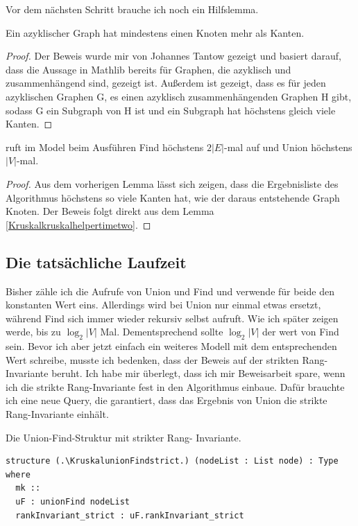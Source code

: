 Vor dem nächsten Schritt brauche ich noch ein Hilfslemma.

\begin{lemma}[\SimpleGraphIsAcycliccardedgeFinsetle]
  Ein azyklischer Graph hat mindestens einen Knoten mehr als Kanten.
\end{lemma}
\begin{proof}
  Der Beweis wurde mir von Johannes Tantow gezeigt und basiert darauf, dass die Aussage in Mathlib bereits für Graphen, die azyklisch und zusammenhängend sind, gezeigt ist.
  Außerdem ist gezeigt, dass es für jeden azyklischen Graphen G, es einen azyklisch zusammenhängenden Graphen H gibt, sodass G ein Subgraph von H ist und ein Subgraph hat höchstens gleich viele Kanten.
\end{proof}

\begin{lemma}[\Kruskalkruskaltimetwo]
  \Kruskalkruskalprog ruft im Model \Kruskalkruskalmodeltwo beim Ausführen Find höchstens $2|E|$-mal auf und Union höchstens $|V|$-mal.
\end{lemma}
\begin{proof}
  Aus dem vorherigen Lemma lässt sich zeigen, dass die Ergebnisliste des Algorithmus höchstens so viele Kanten hat, wie der daraus entstehende Graph Knoten.
  Der Beweis folgt direkt aus dem Lemma \ref{Kruskalkruskalhelpertimetwo}.
\end{proof}



\subsection{Die tatsächliche Laufzeit}

Bisher zähle ich die Aufrufe von Union und Find und verwende für beide den konstanten Wert eins.
Allerdings wird bei Union nur einmal etwas ersetzt, während Find sich immer wieder rekursiv selbst aufruft.
Wie ich später zeigen werde, bis zu $\log_2|V|$ Mal.
Dementsprechend sollte $\log_2|V|$ der wert von Find sein.
Bevor ich aber jetzt einfach ein weiteres Modell mit dem entsprechenden Wert schreibe, musste ich bedenken, dass der Beweis auf der strikten Rang-Invariante beruht.
Ich habe mir überlegt, dass ich mir Beweisarbeit spare, wenn ich die strikte Rang-Invariante fest in den Algorithmus einbaue.
Dafür brauchte ich eine neue Query, die garantiert, dass das Ergebnis von Union die strikte Rang-Invariante einhält.

\begin{definition}[\KruskalunionFindstrict]
  Die Union-Find-Struktur mit strikter Rang- Invariante.
\end{definition}
\begin{lstlisting}
structure (.\KruskalunionFindstrict.) (nodeList : List node) : Type where
  mk ::
  uF : unionFind nodeList
  rankInvariant_strict : uF.rankInvariant_strict
\end{lstlisting}



